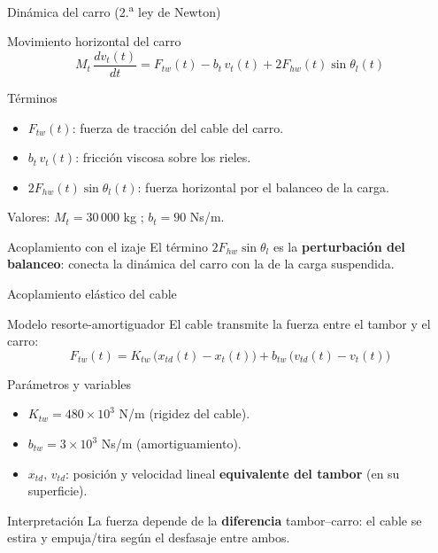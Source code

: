 \begin{frame}{Dinámica del carro (2.\textsuperscript{a} ley de Newton)}
  \begin{block}{Movimiento horizontal del carro}
    \[
    M_t \, \frac{dv_t(t)}{dt} = F_{tw}(t) - b_t \, v_t(t) + 2 F_{hw}(t)\sin\theta_l(t)
    \]
  \end{block}

  \vspace{-0.1cm}
  \begin{block}{Términos}
    \begin{itemize}
      \item $F_{tw}(t)$: fuerza de tracción del cable del carro.
      \item $b_t \, v_t(t)$: fricción viscosa sobre los rieles.
      \item $2 F_{hw}(t)\sin\theta_l(t)$: fuerza horizontal por el balanceo de la carga.
    \end{itemize}
    Valores: $M_t = 30\,000$ kg \quad ; \quad $b_t = 90$ Ns/m.
  \end{block}

  \begin{alertblock}{Acoplamiento con el izaje}
    El término $2 F_{hw}\sin\theta_l$ es la \textbf{perturbación del balanceo}: conecta la
    dinámica del carro con la de la carga suspendida.
  \end{alertblock}
\end{frame}

\begin{frame}{Acoplamiento elástico del cable}
  \begin{block}{Modelo resorte-amortiguador}
    El cable transmite la fuerza entre el tambor y el carro:
    \[
    F_{tw}(t) = K_{tw}\,\big(x_{td}(t) - x_t(t)\big) + b_{tw}\,\big(v_{td}(t) - v_t(t)\big)
    \]
  \end{block}

  \begin{block}{Parámetros y variables}
    \begin{itemize}
      \item $K_{tw} = 480 \times 10^3$ N/m \quad (rigidez del cable).
      \item $b_{tw} = 3 \times 10^3$ Ns/m \quad (amortiguamiento).
      \item $x_{td},\,v_{td}$: posición y velocidad lineal \textbf{equivalente del tambor}
            (en su superficie).
    \end{itemize}
  \end{block}

  \begin{alertblock}{Interpretación}
    La fuerza depende de la \textbf{diferencia} tambor--carro: el cable se estira y empuja/tira
    según el desfasaje entre ambos.
  \end{alertblock}
\end{frame}


